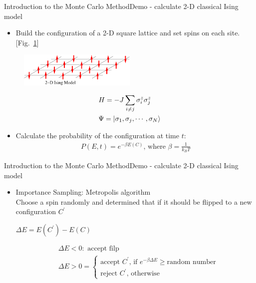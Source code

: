 \documentclass{beamer}
\begin{document}
\begin{frame}{Introduction to the Monte Carlo Method}{Demo - calculate 2-D classical Ising model}
	\begin{itemize}
		\item Build the configuration of a 2-D square lattice and set spins on each site. [Fig.~\ref{2DI}]
	\end{itemize}
	\begin{figure}[h]
		\includegraphics[width=0.50\textwidth]{figures/2DIsing.png}
		\label{2DI}
	\end{figure}
			\begin{align}
				&H = -J \sum_{i \neq j}{\sigma_i^z \sigma_j^z}\\ 
				&\Psi = \Ket{\sigma_1, \sigma_j, \cdots, \sigma_N}
			\end{align}
	\begin{itemize}
		\item Calculate the probability of the configuration at time $t$:
			\begin{align}
				P(E,t) =  e^{-\beta E(C)} \text{, where } \beta = \frac{1}{k_B T}
			\end{align}
	\end{itemize}

\end{frame}

\begin{frame}{Introduction to the Monte Carlo Method}{Demo - calculate 2-D classical Ising model}
	\begin{itemize}
		\item Importance Sampling: Metropolis algorithm \\

			Choose a spin randomly and determined that if it should be flipped to a new configuration $C^{\prime}$ \\
			\centerline{$\Delta E = E(C^{\prime}) - E(C)$}
			\begin{mdframed}
				\begin{align*}
					&\Delta E < 0 : \text{ accept filp} \\ 
					&\Delta E > 0 = \begin{cases}
					\text{accept }C^{\prime} \text{, if } e^{-\beta \Delta E} \geq \text{random number}  \\
					\text{reject }C^{\prime} \text{, otherwise} 
				\end{cases}
				\\
			\end{align*}
		\end{mdframed}
	\end{itemize}
\end{frame}
\end{document}
